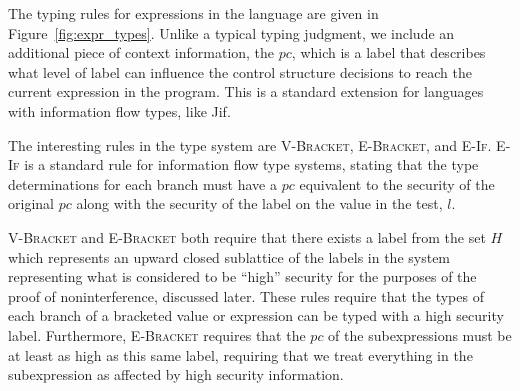 \documentclass[a4paper,twocolumn]{article}
\theoremstyle{plain}
\theoremstyle{definition}
\begin{document}
The typing rules for expressions in the language are given in
Figure~\ref{fig:expr_types}.  Unlike a typical typing judgment, we include an
additional piece of context information, the $pc$, which is a label that
describes what level of label can influence the control structure decisions to
reach the current expression in the program.  This is a standard extension for
languages with information flow types, like Jif.

The interesting rules in the type system are \textsc{V-Bracket},
\textsc{E-Bracket}, and \textsc{E-If}.  \textsc{E-If} is a standard rule for
information flow type systems, stating that the type determinations for each
branch must have a $pc$ equivalent to the security of the original $pc$ along
with the security of the label on the value in the test, $l$.

\textsc{V-Bracket} and \textsc{E-Bracket} both require that there exists a label
from the set $H$ which represents an upward closed sublattice of the labels in
the system representing what is considered to be ``high'' security for the
purposes of the proof of noninterference, discussed later.  These rules require
that the types of each branch of a bracketed value or expression can be typed
with a high security label.  Furthermore, \textsc{E-Bracket} requires that the
$pc$ of the subexpressions must be at least as high as this same label,
requiring that we treat everything in the subexpression as affected by high
security information.
\end{document}
